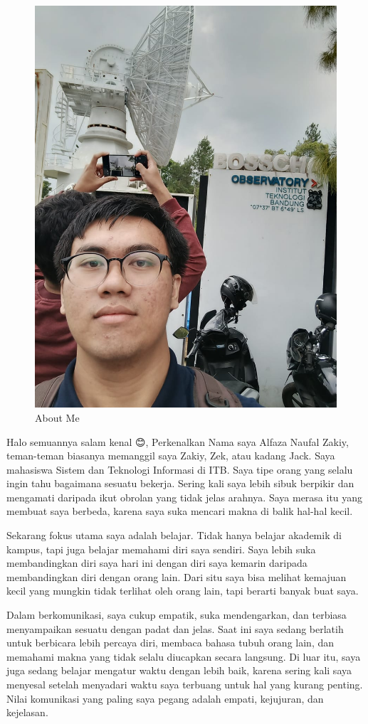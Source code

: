 \documentclass[
  letterpaper,
  DIV=11,
  numbers=noendperiod]{scrreprt}
\begin{document}
\begin{figure}[H]

{\centering \includegraphics[width=0.5\linewidth,height=\textheight,keepaspectratio]{All_About_me/../images/zakiy.jpeg}

}

\caption{About Me}

\end{figure}%

Halo semuannya salam kenal 😊, Perkenalkan Nama saya Alfaza Naufal
Zakiy, teman-teman biasanya memanggil saya Zakiy, Zek, atau kadang Jack.
Saya mahasiswa Sistem dan Teknologi Informasi di ITB. Saya tipe orang
yang selalu ingin tahu bagaimana sesuatu bekerja. Sering kali saya lebih
sibuk berpikir dan mengamati daripada ikut obrolan yang tidak jelas
arahnya. Saya merasa itu yang membuat saya berbeda, karena saya suka
mencari makna di balik hal-hal kecil.

Sekarang fokus utama saya adalah belajar. Tidak hanya belajar akademik
di kampus, tapi juga belajar memahami diri saya sendiri. Saya lebih suka
membandingkan diri saya hari ini dengan diri saya kemarin daripada
membandingkan diri dengan orang lain. Dari situ saya bisa melihat
kemajuan kecil yang mungkin tidak terlihat oleh orang lain, tapi berarti
banyak buat saya.

Dalam berkomunikasi, saya cukup empatik, suka mendengarkan, dan terbiasa
menyampaikan sesuatu dengan padat dan jelas. Saat ini saya sedang
berlatih untuk berbicara lebih percaya diri, membaca bahasa tubuh orang
lain, dan memahami makna yang tidak selalu diucapkan secara langsung. Di
luar itu, saya juga sedang belajar mengatur waktu dengan lebih baik,
karena sering kali saya menyesal setelah menyadari waktu saya terbuang
untuk hal yang kurang penting. Nilai komunikasi yang paling saya pegang
adalah empati, kejujuran, dan kejelasan.
\end{document}
